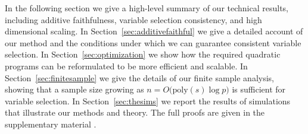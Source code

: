 %
%

In the following section we give a high-level summary of our technical
results, including additive faithfulness, variable selection 
consistency, and high dimensional scaling.  In
Section~\ref{sec:additivefaithful} we give a detailed account
of our method and the conditions under which we can guarantee
consistent variable selection.  In Section~\ref{sec:optimization}
we show how the required quadratic programs can be reformulated
to be more efficient and scalable.  In Section~\ref{sec:finitesample}
we give the details of our finite sample analysis, showing
that a sample size growing as $n = O\big(\textrm{poly}(s) \log p\big)$
is sufficient for variable selection.  In Section~\ref{sec:thesims}
we report the results of simulations that illustrate our methods
and theory.  The full proofs are
given in the supplementary material \citep{supplement}.





